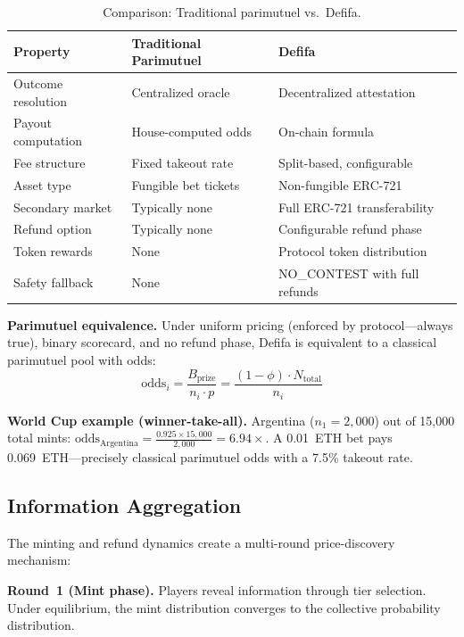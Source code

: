 \documentclass[11pt,a4paper]{article}
\begin{document}
\begin{table}[H]
\centering
\begin{tabular}{lll}
\toprule
\textbf{Property} & \textbf{Traditional Parimutuel} & \textbf{Defifa} \\
\midrule
Outcome resolution & Centralized oracle & Decentralized attestation \\
Payout computation & House-computed odds & On-chain formula \\
Fee structure & Fixed takeout rate & Split-based, configurable \\
Asset type & Fungible bet tickets & Non-fungible ERC-721 \\
Secondary market & Typically none & Full ERC-721 transferability \\
Refund option & Typically none & Configurable refund phase \\
Token rewards & None & Protocol token distribution \\
Safety fallback & None & NO\_CONTEST with full refunds \\
\bottomrule
\end{tabular}
\caption{Comparison: Traditional parimutuel vs.\ Defifa.}
\end{table}

\textbf{Parimutuel equivalence.} Under uniform pricing (enforced by protocol---always true), binary scorecard, and no refund phase, Defifa is equivalent to a classical parimutuel pool with odds:
\begin{equation}
\text{odds}_i = \frac{B_{\text{prize}}}{n_i \cdot p} = \frac{(1 - \phi) \cdot N_{\text{total}}}{n_i}
\end{equation}

\textbf{World Cup example (winner-take-all).} Argentina ($n_1 = 2{,}000$) out of 15,000 total mints: $\text{odds}_{\text{Argentina}} = \frac{0.925 \times 15{,}000}{2{,}000} = 6.94\times$. A 0.01~ETH bet pays 0.069~ETH---precisely classical parimutuel odds with a 7.5\% takeout rate.

\subsection{Information Aggregation}

The minting and refund dynamics create a multi-round price-discovery mechanism:

\textbf{Round~1 (Mint phase).} Players reveal information through tier selection. Under equilibrium, the mint distribution converges to the collective probability distribution.
\end{document}
